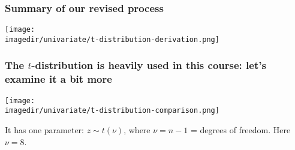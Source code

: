 \begin{frame}\frametitle{Summary of our revised process}
	\begin{center}
		\texttt{[image: \\imagedir/univariate/t-distribution-derivation.png]}
	\end{center}
	
\end{frame}

\begin{frame}\frametitle{The $t$-distribution is heavily used in this course: let's examine it a bit more}
		\begin{center}
		\texttt{[image: \\imagedir/univariate/t-distribution-comparison.png]}
	\end{center}
	It has one parameter: $z \sim t\left(\nu\right)$, where $\nu = n-1$ = degrees of freedom. Here $\nu=8$.
\end{frame}

